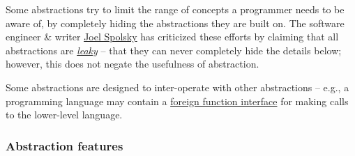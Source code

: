 \documentclass{article}
\begin{document}
Some abstractions try to limit the range of concepts a programmer needs to be aware of, by completely hiding the abstractions they are built on. The software engineer \& writer \href{https://en.wikipedia.org/wiki/Joel_Spolsky}{\sc Joel Spolsky} has criticized these efforts by claiming that all abstractions are \href{https://en.wikipedia.org/wiki/Leaky_abstraction}{\it leaky} -- that they can never completely hide the details below; however, this does not negate the usefulness of abstraction.

Some abstractions are designed to inter-operate with other abstractions -- e.g., a programming language may contain a \href{https://en.wikipedia.org/wiki/Foreign_function_interface}{foreign function interface} for making calls to the lower-level language.

\subsubsection{Abstraction features}
\end{document}
